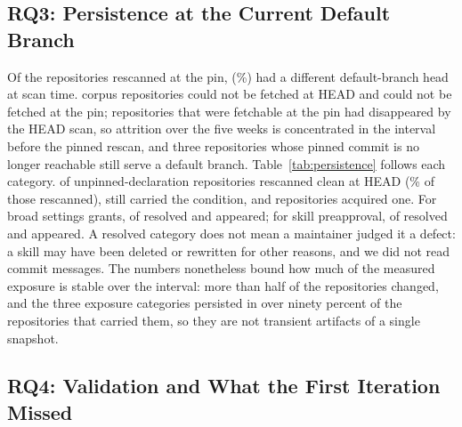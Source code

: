 \documentclass[10pt,conference]{IEEEtran}
\newcommand{\pct}[1]{#1\%}
\begin{document}
\subsection{RQ3: Persistence at the Current Default Branch}
\label{sec:persistence}

\begin{table}[t]
\centering
\caption{Persistence. Repositories flagged in Scan B (pinned commit) and their state in Scan C (default branch, five weeks later, same instrument). \emph{Resolved} means the repository rescanned clean for that category; \emph{gone} means it could not be fetched; \emph{new} means flagged at HEAD only.}
\label{tab:persistence}
\small

\end{table}

Of the \NPinnedOk{} repositories rescanned at the pin, \NMovedHead{} (\pct{\PctMovedHead}) had a different default-branch head at scan time. \NHeadUnfetchable{} corpus repositories could not be fetched at HEAD and \NPinnedUnfetchable{} could not be fetched at the pin; \NGoneAfterPin{} repositories that were fetchable at the pin had disappeared by the HEAD scan, so attrition over the five weeks is concentrated in the interval before the pinned rescan, and three repositories whose pinned commit is no longer reachable still serve a default branch. Table~\ref{tab:persistence} follows each category. \PersSOneResolvedAtHead{} of \PersSOneFlaggedAtPin{} unpinned-declaration repositories rescanned clean at HEAD (\pct{\PersSOneResolvedPctOfRescanned} of those rescanned), \PersSOneStillAtHead{} still carried the condition, and \PersSOneNewAtHead{} repositories acquired one. For broad settings grants, \PersSTwoResolvedAtHead{} of \PersSTwoFlaggedAtPin{} resolved and \PersSTwoNewAtHead{} appeared; for skill preapproval, \PersSThreeResolvedAtHead{} of \PersSThreeFlaggedAtPin{} resolved and \PersSThreeNewAtHead{} appeared. A resolved category does not mean a maintainer judged it a defect: a skill may have been deleted or rewritten for other reasons, and we did not read commit messages. The numbers nonetheless bound how much of the measured exposure is stable over the interval: more than half of the repositories changed, and the three exposure categories persisted in over ninety percent of the repositories that carried them, so they are not transient artifacts of a single snapshot.

\subsection{RQ4: Validation and What the First Iteration Missed}
\label{sec:validation}
\end{document}
